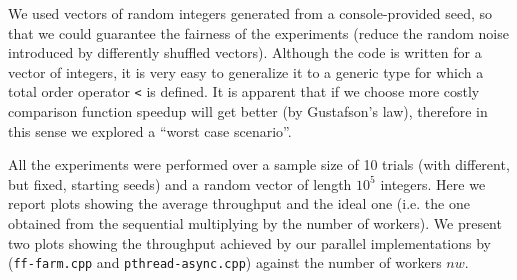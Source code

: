 \documentclass[12pt]{article}
\begin{document}
We used vectors of random integers generated from a console-provided
seed, so that we could guarantee the fairness of the experiments
(reduce the random noise introduced by differently shuffled
vectors). Although the code is written for a vector of integers, it is
very easy to generalize it to a generic type for which a total order
operator \texttt{<} is defined. It is apparent that if we choose more
costly comparison function speedup  will get better
(by Gustafson's law), therefore in this sense we explored a ``worst case
scenario''.

All the experiments were performed over a sample size of 10 trials
(with different, but fixed, starting seeds) and
a random vector of length $10^5$ integers. Here we report plots
showing the average throughput and the ideal one (i.e. the one
obtained from the sequential multiplying by the number of workers).
We present two plots showing the throughput achieved by our parallel
implementations by
(\texttt{ff-farm.cpp} and \texttt{pthread-async.cpp}) against the number of
workers $nw$.
\end{document}
